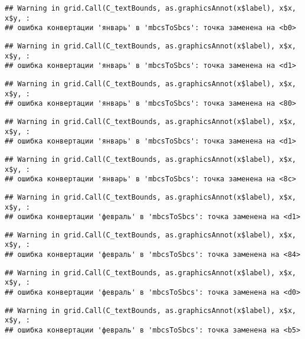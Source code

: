 \documentclass[
]{article}
\begin{document}
\begin{verbatim}
## Warning in grid.Call(C_textBounds, as.graphicsAnnot(x$label), x$x, x$y, :
## ошибка конвертации 'январь' в 'mbcsToSbcs': точка заменена на <b0>
\end{verbatim}

\begin{verbatim}
## Warning in grid.Call(C_textBounds, as.graphicsAnnot(x$label), x$x, x$y, :
## ошибка конвертации 'январь' в 'mbcsToSbcs': точка заменена на <d1>
\end{verbatim}

\begin{verbatim}
## Warning in grid.Call(C_textBounds, as.graphicsAnnot(x$label), x$x, x$y, :
## ошибка конвертации 'январь' в 'mbcsToSbcs': точка заменена на <80>
\end{verbatim}

\begin{verbatim}
## Warning in grid.Call(C_textBounds, as.graphicsAnnot(x$label), x$x, x$y, :
## ошибка конвертации 'январь' в 'mbcsToSbcs': точка заменена на <d1>
\end{verbatim}

\begin{verbatim}
## Warning in grid.Call(C_textBounds, as.graphicsAnnot(x$label), x$x, x$y, :
## ошибка конвертации 'январь' в 'mbcsToSbcs': точка заменена на <8c>
\end{verbatim}

\begin{verbatim}
## Warning in grid.Call(C_textBounds, as.graphicsAnnot(x$label), x$x, x$y, :
## ошибка конвертации 'февраль' в 'mbcsToSbcs': точка заменена на <d1>
\end{verbatim}

\begin{verbatim}
## Warning in grid.Call(C_textBounds, as.graphicsAnnot(x$label), x$x, x$y, :
## ошибка конвертации 'февраль' в 'mbcsToSbcs': точка заменена на <84>
\end{verbatim}

\begin{verbatim}
## Warning in grid.Call(C_textBounds, as.graphicsAnnot(x$label), x$x, x$y, :
## ошибка конвертации 'февраль' в 'mbcsToSbcs': точка заменена на <d0>
\end{verbatim}

\begin{verbatim}
## Warning in grid.Call(C_textBounds, as.graphicsAnnot(x$label), x$x, x$y, :
## ошибка конвертации 'февраль' в 'mbcsToSbcs': точка заменена на <b5>
\end{verbatim}
\end{document}
